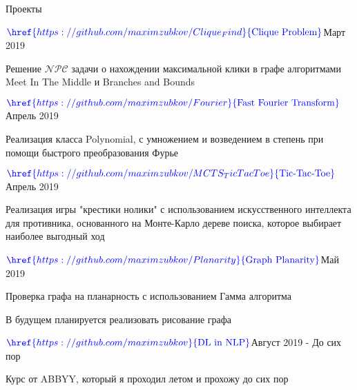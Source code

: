 \documentclass{resume} %
\begin{document}
\begin{rSection}{Проекты}
\begin{rSubsection}{$\textcolor{blue}{\href{https://github.com/maximzubkov/Clique_Find}{\textnormal{Clique Problem}}}$}{Март 2019}{}{}
\item Решение $\mathcal{NPC}$ задачи о нахождении максимальной клики в графе алгоритмами Meet In The Middle и  Branches and Bounds
\end{rSubsection}

\begin{rSubsection}{$\textcolor{blue}{\href{https://github.com/maximzubkov/Fourier}{\textnormal{Fast Fourier Transform}}}$}{Апрель 2019}{}{}
\item Реализация класса Polynomial, с умножением и возведением в степень при помощи быстрого преобразования Фурье
\end{rSubsection}

\begin{rSubsection}{$\textcolor{blue}{\href{https://github.com/maximzubkov/MCTS_TicTacToe}{\textnormal{Tic-Tac-Toe}}}$}{Апрель 2019}{}{}
\item Реализация игры "крестики нолики" с использованием искусственного интеллекта для противника, основанного на Монте-Карло дереве поиска, которое выбирает наиболее выгодный ход
\end{rSubsection}

\begin{rSubsection}{$\textcolor{blue}{\href{https://github.com/maximzubkov/Planarity}{\textnormal{Graph Planarity}}}$}{Май 2019}{}{}
\item Проверка графа на планарность с использованием Гамма алгоритма
\item В будущем планируется реализовать рисование графа 
\end{rSubsection}

\begin{rSubsection}{$\textcolor{blue}{\href{https://github.com/maximzubkov}{\textnormal{DL in NLP}}}$}{Август 2019 - До сих пор}{}{}
\item Курс от ABBYY, который я проходил летом и прохожу до сих пор 
\end{rSubsection}

\end{rSection}
\end{document}
